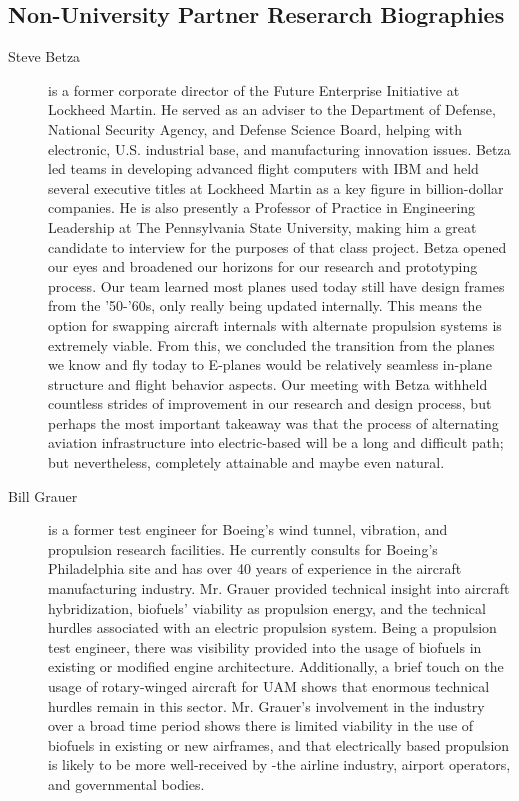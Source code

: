 \documentclass[../main.tex]{subfiles}
\begin{document}
\begin{appendices}
\begin{singlespace}
\section{Non-University Partner Reserarch Biographies}\label{apxC}
\begin{description}
    \item [Steve Betza] is a former corporate director of the Future Enterprise Initiative at Lockheed Martin. He served as an adviser to the Department of Defense, National Security Agency, and Defense Science Board, helping with electronic, U.S. industrial base, and manufacturing innovation issues. Betza led teams in developing advanced flight computers with IBM and held several executive titles at Lockheed Martin as a key figure in billion-dollar companies. He is also presently a Professor of Practice in Engineering Leadership at The Pennsylvania State University, making him a great candidate to interview for the purposes of that class project. Betza opened our eyes and broadened our horizons for our research and prototyping process. Our team learned most planes used today still have design frames from the '50-'60s, only really being updated internally. This means the option for swapping aircraft internals with alternate propulsion systems is extremely viable. From this, we concluded the transition from the planes we know and fly today to E-planes would be relatively seamless in-plane structure and flight behavior aspects. Our meeting with Betza withheld countless strides of improvement in our research and design process, but perhaps the most important takeaway was that the process of alternating aviation infrastructure into electric-based will be a long and difficult path; but nevertheless, completely attainable and maybe even natural.
    
    \item [Bill Grauer] is a former test engineer for Boeing’s wind tunnel, vibration, and propulsion research facilities. He currently consults for Boeing’s Philadelphia site and has over 40 years of experience in the aircraft manufacturing industry. Mr. Grauer provided technical insight into aircraft hybridization, biofuels' viability as propulsion energy, and the technical hurdles associated with an electric propulsion system. Being a propulsion test engineer, there was visibility provided into the usage of biofuels in existing or modified engine architecture. Additionally, a brief touch on the usage of rotary-winged aircraft for UAM shows that enormous technical hurdles remain in this sector. Mr. Grauer’s involvement in the industry over a broad time period shows there is limited viability in the use of biofuels in existing or new airframes, and that electrically based propulsion is likely to be more well-received by -the airline industry, airport operators, and governmental bodies.
\end{description}


\end{singlespace}
\end{appendices}
\end{document}
